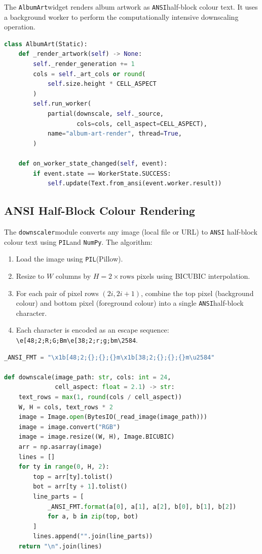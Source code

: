 \documentclass[a4paper,11pt,twoside]{article}
\newcommand{\ansi}{\texttt{ANSI}}
\newcommand{\pil}{\texttt{PIL}}
\newcommand{\downscaler}{\texttt{downscaler}}
\newcommand{\albumart}{\texttt{AlbumArt}}
\newcommand{\numpy}{\texttt{NumPy}\xspace}
\begin{document}
The \albumart widget renders album artwork as \ansi half-block colour text.
It uses a background worker to perform the computationally intensive
downscaling operation.

\begin{lstlisting}[language=Python, caption={AlbumArt widget rendering.}]
class AlbumArt(Static):
    def _render_artwork(self) -> None:
        self._render_generation += 1
        cols = self._art_cols or round(
            self.size.height * CELL_ASPECT
        )
        self.run_worker(
            partial(downscale, self._source,
                    cols=cols, cell_aspect=CELL_ASPECT),
            name="album-art-render", thread=True,
        )

    def on_worker_state_changed(self, event):
        if event.state == WorkerState.SUCCESS:
            self.update(Text.from_ansi(event.worker.result))
\end{lstlisting}

\subsection{ANSI Half-Block Colour Rendering}

The \downscaler module converts any image (local file or URL) to \ansi
half-block colour text using \pil and \numpy \cite{numpy,pillow}. The algorithm:

\begin{enumerate}
    \item Load the image using \pil (Pillow).
    \item Resize to $W$ columns by $H = 2 \times \text{rows}$ pixels
          using BICUBIC interpolation.
    \item For each pair of pixel rows $(2i, 2i+1)$, combine the top pixel
          (background colour) and bottom pixel (foreground colour) into a
          single \ansi half-block character.
    \item Each character is encoded as an escape sequence:
          \texttt{\textbackslash{}e[48;2;R;G;Bm\textbackslash{}e[38;2;r;g;bm\textbackslash{}2584}.
\end{enumerate}

\begin{lstlisting}[language=Python, caption={The core downscaling algorithm.}]
_ANSI_FMT = "\x1b[48;2;{};{};{}m\x1b[38;2;{};{};{}m\u2584"

def downscale(image_path: str, cols: int = 24,
              cell_aspect: float = 2.1) -> str:
    text_rows = max(1, round(cols / cell_aspect))
    W, H = cols, text_rows * 2
    image = Image.open(BytesIO(_read_image(image_path)))
    image = image.convert("RGB")
    image = image.resize((W, H), Image.BICUBIC)
    arr = np.asarray(image)
    lines = []
    for ty in range(0, H, 2):
        top = arr[ty].tolist()
        bot = arr[ty + 1].tolist()
        line_parts = [
            _ANSI_FMT.format(a[0], a[1], a[2], b[0], b[1], b[2])
            for a, b in zip(top, bot)
        ]
        lines.append("".join(line_parts))
    return "\n".join(lines)
\end{lstlisting}
\end{document}
